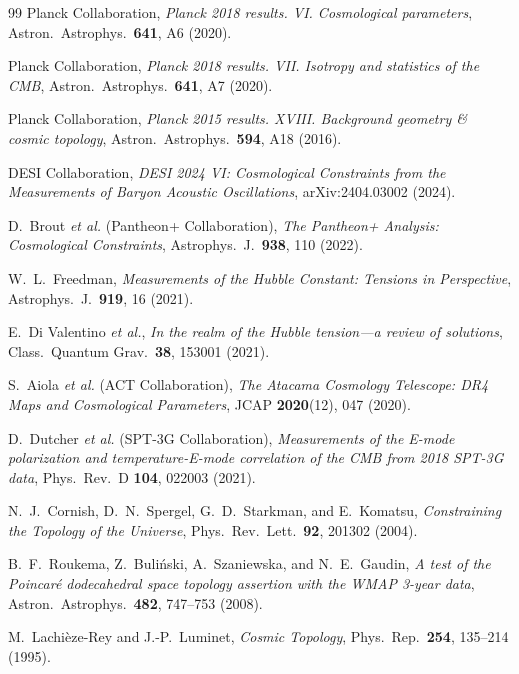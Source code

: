 \documentclass[11pt,a4paper]{article}
\theoremstyle{definition}
\begin{document}
\begin{thebibliography}{99}
Planck Collaboration,
\textit{Planck 2018 results. VI. Cosmological parameters},
Astron.\ Astrophys.\ \textbf{641}, A6 (2020).

Planck Collaboration,
\textit{Planck 2018 results. VII. Isotropy and statistics of the CMB},
Astron.\ Astrophys.\ \textbf{641}, A7 (2020).

Planck Collaboration,
\textit{Planck 2015 results. XVIII. Background geometry \& cosmic topology},
Astron.\ Astrophys.\ \textbf{594}, A18 (2016).

DESI Collaboration,
\textit{DESI 2024 VI: Cosmological Constraints from the Measurements of Baryon Acoustic Oscillations},
arXiv:2404.03002 (2024).

D.~Brout \textit{et al.} (Pantheon+ Collaboration),
\textit{The Pantheon+ Analysis: Cosmological Constraints},
Astrophys.\ J.\ \textbf{938}, 110 (2022).

W.~L.~Freedman,
\textit{Measurements of the Hubble Constant: Tensions in Perspective},
Astrophys.\ J.\ \textbf{919}, 16 (2021).

E.~Di Valentino \textit{et al.},
\textit{In the realm of the Hubble tension---a review of solutions},
Class.\ Quantum Grav.\ \textbf{38}, 153001 (2021).

S.~Aiola \textit{et al.} (ACT Collaboration),
\textit{The Atacama Cosmology Telescope: DR4 Maps and Cosmological Parameters},
JCAP \textbf{2020}(12), 047 (2020).

D.~Dutcher \textit{et al.} (SPT-3G Collaboration),
\textit{Measurements of the E-mode polarization and temperature-E-mode correlation of the CMB from 2018 SPT-3G data},
Phys.\ Rev.\ D \textbf{104}, 022003 (2021).

N.~J.~Cornish, D.~N.~Spergel, G.~D.~Starkman, and E.~Komatsu,
\textit{Constraining the Topology of the Universe},
Phys.\ Rev.\ Lett.\ \textbf{92}, 201302 (2004).

B.~F.~Roukema, Z.~Buli\'nski, A.~Szaniewska, and N.~E.~Gaudin,
\textit{A test of the Poincar\'e dodecahedral space topology assertion with the WMAP 3-year data},
Astron.\ Astrophys.\ \textbf{482}, 747--753 (2008).

M.~Lachi\`eze-Rey and J.-P.~Luminet,
\textit{Cosmic Topology},
Phys.\ Rep.\ \textbf{254}, 135--214 (1995).


\end{thebibliography}
\end{document}

